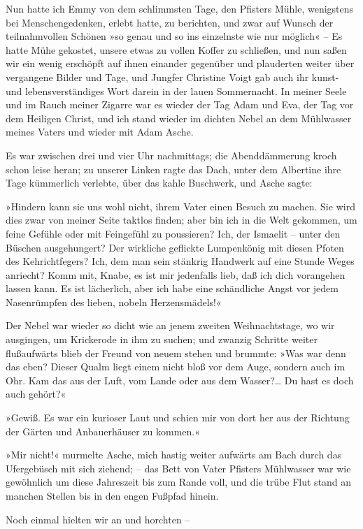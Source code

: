 Nun hatte ich Emmy von dem schlimmsten Tage, den Pfisters Mühle,
wenigstens bei Menschengedenken, erlebt hatte, zu berichten, und
zwar auf Wunsch der teilnahmvollen Schönen »so genau und so ins
einzelnste wie nur möglich« – Es hatte Mühe gekostet, unsere etwas
zu vollen Koffer zu schließen, und nun saßen wir ein wenig
erschöpft auf ihnen einander gegenüber und plauderten weiter über
vergangene Bilder und Tage, und Jungfer Christine Voigt gab auch
ihr kunst- und lebensverständiges Wort darein in der lauen
Sommernacht. In meiner Seele und im Rauch meiner Zigarre war es
wieder der Tag Adam und Eva, der Tag vor dem Heiligen Christ, und
ich stand wieder im dichten Nebel an dem Mühlwasser meines Vaters
und wieder mit Adam Asche.

Es war zwischen drei und vier Uhr nachmittags; die Abenddämmerung
kroch schon leise heran; zu unserer Linken ragte das Dach, unter
dem Albertine ihre Tage kümmerlich verlebte, über das kahle
Buschwerk, und Asche sagte:

»Hindern kann sie uns wohl nicht, ihrem Vater einen Besuch zu
machen. Sie wird dies zwar von meiner Seite taktlos finden; aber
bin ich in die Welt gekommen, um feine Gefühle oder mit Feingefühl
zu poussieren? Ich, der Ismaelit – unter den Büschen ausgehungert?
Der wirkliche geflickte Lumpenkönig mit diesen Pfoten des
Kehrichtfegers? Ich, dem man sein stänkrig Handwerk auf eine Stunde
Weges anriecht? Komm mit, Knabe, es ist mir jedenfalls lieb, daß
ich dich vorangehen lassen kann. Es ist lächerlich, aber ich habe
eine schändliche Angst vor jedem Nasenrümpfen des lieben, nobeln
Herzensmädels!«

Der Nebel war wieder so dicht wie an jenem zweiten Weihnachtstage,
wo wir ausgingen, um Krickerode in ihm zu suchen; und zwanzig
Schritte weiter flußaufwärts blieb der Freund von neuem stehen und
brummte: »Was war denn das eben? Dieser Qualm liegt einem nicht
bloß vor dem Auge, sondern auch im Ohr. Kam das aus der Luft, vom
Lande oder aus dem Wasser?\ldots{} Du hast es doch auch gehört?«

»Gewiß. Es war ein kurioser Laut und schien mir von dort her aus
der Richtung der Gärten und Anbauerhäuser zu kommen.«

»Mir nicht!« murmelte Asche, mich hastig weiter aufwärts am Bach
durch das Ufergebüsch mit sich ziehend; – das Bett von Vater
Pfisters Mühlwasser war wie gewöhnlich um diese Jahreszeit bis zum
Rande voll, und die trübe Flut stand an manchen Stellen bis in den
engen Fußpfad hinein.

Noch einmal hielten wir an und horchten –

